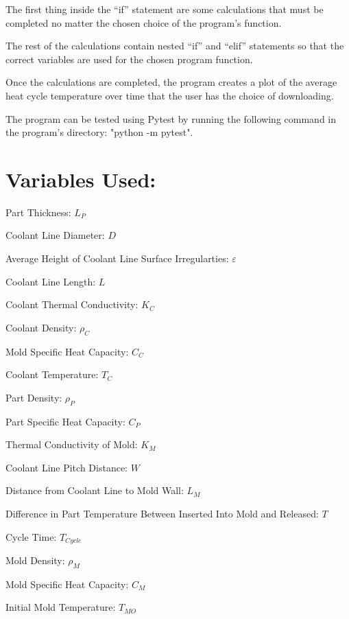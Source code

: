 \documentclass[a4paper,12pt]{article}
\begin{document}
\medskip

The first thing inside the “if” statement are some calculations that must be completed no matter the chosen choice of the program’s function. 

\medskip

The rest of the calculations contain nested “if” and “elif” statements so that the correct variables are used for the chosen program function.

\medskip

Once the calculations are completed, the program creates a plot of the average heat cycle temperature over time that the user has the choice of downloading.

\medskip

The program can be tested using Pytest by running the following command in the program's directory: "python -m pytest".

\clearpage

\section*{Variables Used:}

\medskip

Part Thickness: $L_{P}$

Coolant Line Diameter: $D$

Average Height of Coolant Line Surface Irregularties: $\varepsilon$

Coolant Line Length: $L$

Coolant Thermal Conductivity: $K_{C}$

Coolant Density: $\rho_{C}$

Mold Specific Heat Capacity: $C_{C}$

Coolant Temperature: $T_{C}$

Part Density: $\rho_{P}$

Part Specific Heat Capacity: $C_{P}$

Thermal Conductivity of Mold: $K_{M}$

Coolant Line Pitch Distance: $W$

Distance from Coolant Line to Mold Wall: $L_{M}$

Difference in Part Temperature Between Inserted Into Mold and Released: $T$

Cycle Time: $T_{Cycle}$

Mold Density: $\rho_{M}$

Mold Specific Heat Capacity: $C_{M}$

Initial Mold Temperature: $T_{MO}$
\end{document}
